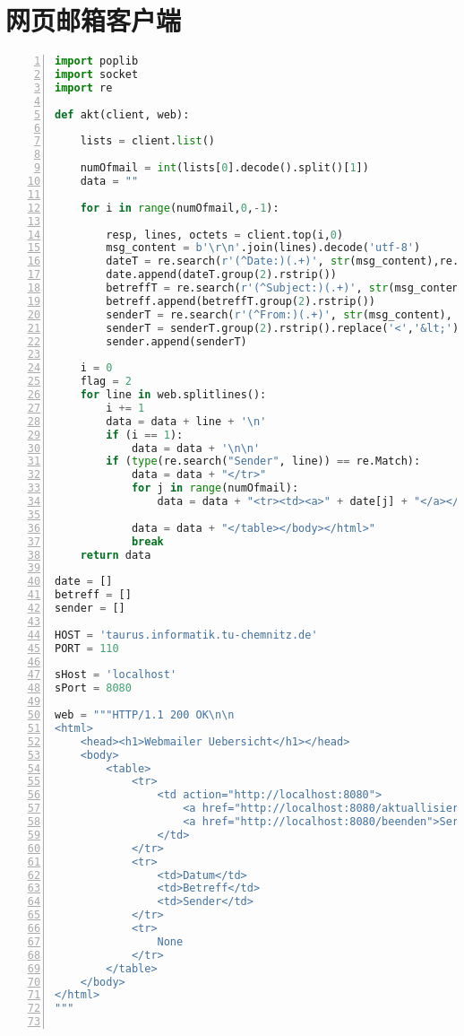 \documentclass[fleqn]{article}
\begin{document}
\section{网页邮箱客户端}
\begin{lstlisting}[language = Python, numbers=left, 
    numberstyle=\tiny,keywordstyle=\color{blue!70},
    commentstyle=\color{red!50!green!50!blue!50},frame=shadowbox,
    rulesepcolor=\color{red!20!green!20!blue!20},basicstyle=\ttfamily]
import poplib
import socket
import re

def akt(client, web):
    
    lists = client.list()
    
    numOfmail = int(lists[0].decode().split()[1])
    data = ""
    
    for i in range(numOfmail,0,-1):

        resp, lines, octets = client.top(i,0)
        msg_content = b'\r\n'.join(lines).decode('utf-8')
        dateT = re.search(r'(^Date:)(.+)', str(msg_content),re.M)
        date.append(dateT.group(2).rstrip())
        betreffT = re.search(r'(^Subject:)(.+)', str(msg_content), re.M)
        betreff.append(betreffT.group(2).rstrip())
        senderT = re.search(r'(^From:)(.+)', str(msg_content), re.M)
        senderT = senderT.group(2).rstrip().replace('<','&lt;').replace('>','&gt;')
        sender.append(senderT)

    i = 0
    flag = 2
    for line in web.splitlines():
        i += 1
        data = data + line + '\n'
        if (i == 1):
            data = data + '\n\n'
        if (type(re.search("Sender", line)) == re.Match):
            data = data + "</tr>"
            for j in range(numOfmail):
                data = data + "<tr><td><a>" + date[j] + "</a></td><td><a href="">" + betreff[j] + "</a></td><td><a>" + sender[j] + "</a></td></tr><br/>\n"
                
            data = data + "</table></body></html>"
            break
    return data

date = []
betreff = []
sender = []

HOST = 'taurus.informatik.tu-chemnitz.de'
PORT = 110

sHost = 'localhost'
sPort = 8080

web = """HTTP/1.1 200 OK\n\n
<html>
    <head><h1>Webmailer Uebersicht</h1></head>
    <body>
        <table>
            <tr>
                <td action="http://localhost:8080">
                    <a href="http://localhost:8080/aktuallisieren">Aktuallisieren</a></br>
                    <a href="http://localhost:8080/beenden">Server beenden</a></br>
                </td>
            </tr>
            <tr>
                <td>Datum</td>
                <td>Betreff</td>
                <td>Sender</td>
            </tr>
            <tr>
                None
            </tr>
        </table>
    </body>
</html>
"""


\end{lstlisting}
\end{document}
